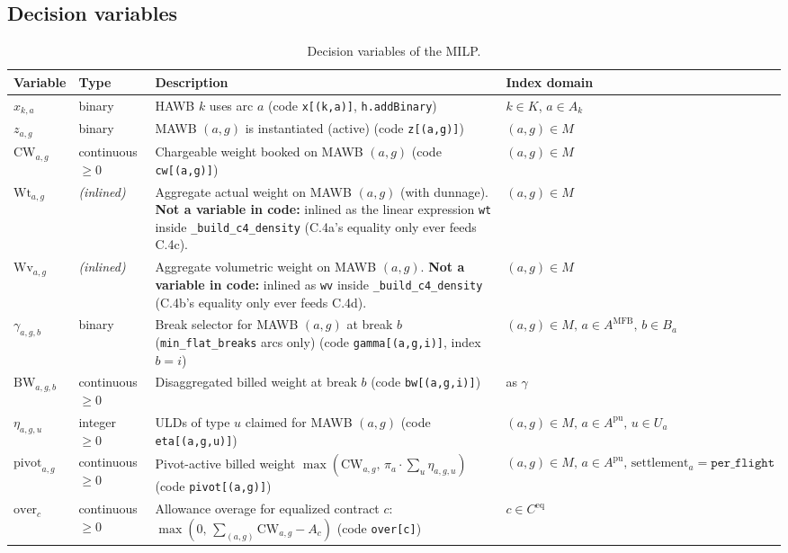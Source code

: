 \documentclass[11pt,a4paper]{article}
\theoremstyle{definition}
\begin{document}
\subsection*{Decision variables}

\begin{table}[H]
\centering
\caption{Decision variables of the MILP.}
\label{tab:decision-variables}
\begin{tabular}{p{3.5cm}p{2.5cm}p{6cm}p{1.5cm}}
\toprule
Variable & Type & Description & Index domain \\
\midrule
$x_{k,a}$ & binary & HAWB $k$ uses arc $a$ (code \texttt{x[(k,a)]}, \texttt{h.addBinary}) & $k \in K$, $a \in A_k$ \\
$z_{a,g}$ & binary & MAWB $(a, g)$ is instantiated (active) (code \texttt{z[(a,g)]}) & $(a, g) \in M$ \\
$\text{CW}_{a,g}$ & continuous $\geq 0$ & Chargeable weight booked on MAWB $(a, g)$ (code \texttt{cw[(a,g)]}) & $(a, g) \in M$ \\
$\text{Wt}_{a,g}$ & \emph{(inlined)} & Aggregate actual weight on MAWB $(a, g)$ (with dunnage). \textbf{Not a variable in code:} inlined as the linear expression \texttt{wt} inside \texttt{\_build\_c4\_density} (C.4a's equality only ever feeds C.4c). & $(a, g) \in M$ \\
$\text{Wv}_{a,g}$ & \emph{(inlined)} & Aggregate volumetric weight on MAWB $(a, g)$. \textbf{Not a variable in code:} inlined as \texttt{wv} inside \texttt{\_build\_c4\_density} (C.4b's equality only ever feeds C.4d). & $(a, g) \in M$ \\
$\gamma_{a,g,b}$ & binary & Break selector for MAWB $(a, g)$ at break $b$ (\texttt{min\_flat\_breaks} arcs only) (code \texttt{gamma[(a,g,i)]}, index $b\!=\!i$) & $(a, g) \in M,\, a \in A^{\text{MFB}},\, b \in B_a$ \\
$\text{BW}_{a,g,b}$ & continuous $\geq 0$ & Disaggregated billed weight at break $b$ (code \texttt{bw[(a,g,i)]}) & as $\gamma$ \\
$\eta_{a,g,u}$ & integer $\geq 0$ & ULDs of type $u$ claimed for MAWB $(a, g)$ (code \texttt{eta[(a,g,u)]}) & $(a, g) \in M,\, a \in A^{\text{pu}},\, u \in U_a$ \\
$\text{pivot}_{a,g}$ & continuous $\geq 0$ & Pivot-active billed weight $\max(\text{CW}_{a,g},\, \pi_a \cdot \sum_u \eta_{a,g,u})$ (code \texttt{pivot[(a,g)]}) & $(a, g) \in M,\, a \in A^{\text{pu}},\, \text{settlement}_a = \texttt{per\_flight}$ \\
$\text{over}_c$ & continuous $\geq 0$ & Allowance overage for equalized contract $c$: $\max(0,\, \sum_{(a,g)} \text{CW}_{a,g} - A_c)$ (code \texttt{over[c]}) & $c \in C^{\text{eq}}$ \\

\end{tabular}
\end{table}
\end{document}
